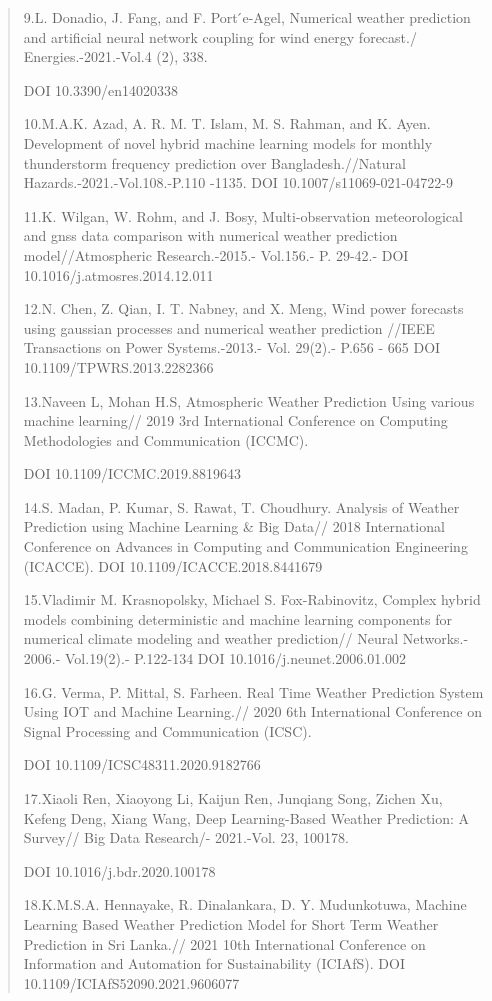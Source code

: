 \begin{quote}
9.L. Donadio, J. Fang, and F. Port ́e-Agel, Numerical weather prediction
and artificial neural network coupling for wind energy forecast./
Energies.-2021.-Vol.4 (2), 338.

DOI 10.3390/en14020338

10.M.A.K. Azad, A. R. M. T. Islam, M. S. Rahman, and K. Ayen.
Development of novel hybrid machine learning models for monthly
thunderstorm frequency prediction over Bangladesh.//Natural
Hazards.-2021.-Vol.108.-P.110 -1135. DOI 10.1007/s11069-021-04722-9

11.K. Wilgan, W. Rohm, and J. Bosy, Multi-observation meteorological and
gnss data comparison with numerical weather prediction
model//Atmospheric Research.-2015.- Vol.156.- P. 29-42.- DOI
10.1016/j.atmosres.2014.12.011

12.N. Chen, Z. Qian, I. T. Nabney, and X. Meng, Wind power forecasts
using gaussian processes and numerical weather prediction //IEEE
Transactions on Power Systems.-2013.- Vol. 29(2).- P.656 - 665 DOI
10.1109/TPWRS.2013.2282366

13.Naveen L, Mohan H.S, Atmospheric Weather Prediction Using various
machine learning// 2019 3rd International Conference on Computing
Methodologies and Communication (ICCMC).

DOI 10.1109/ICCMC.2019.8819643

14.S. Madan, P. Kumar, S. Rawat, T. Choudhury. Analysis of Weather
Prediction using Machine Learning \& Big Data// 2018 International
Conference on Advances in Computing and Communication Engineering
(ICACCE). DOI 10.1109/ICACCE.2018.8441679

15.Vladimir M. Krasnopolsky, Michael S. Fox-Rabinovitz, Complex hybrid
models combining deterministic and machine learning components for
numerical climate modeling and weather prediction// Neural Networks.-
2006.- Vol.19(2).- P.122-134 DOI 10.1016/j.neunet.2006.01.002

16.G. Verma, P. Mittal, S. Farheen. Real Time Weather Prediction System
Using IOT and Machine Learning.// 2020 6th International Conference on
Signal Processing and Communication (ICSC).

DOI 10.1109/ICSC48311.2020.9182766

17.Xiaoli Ren, Xiaoyong Li, Kaijun Ren, Junqiang Song, Zichen Xu, Kefeng
Deng, Xiang Wang, Deep Learning-Based Weather Prediction: A Survey// Big
Data Research/- 2021.-Vol. 23, 100178.

DOI 10.1016/j.bdr.2020.100178

18.K.M.S.A. Hennayake, R. Dinalankara, D. Y. Mudunkotuwa, Machine
Learning Based Weather Prediction Model for Short Term Weather
Prediction in Sri Lanka.// 2021 10th International Conference on
Information and Automation for Sustainability (ICIAfS). DOI
10.1109/ICIAfS52090.2021.9606077


\end{quote}
